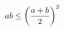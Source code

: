 \documentclass{article} %
\begin{document}
\[ ab \leq \left( {a+b \over 2} \right)^2 \]
\end{document}

